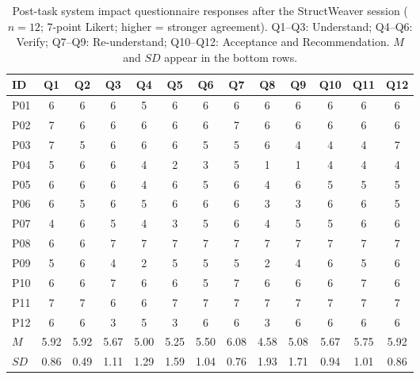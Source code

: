 \documentclass[manuscript,review,anonymous]{acmart}
\begin{document}
\begin{table}[t]
\centering
\caption{Post-task system impact questionnaire responses after the StructWeaver session ($n=12$; 7-point Likert; higher = stronger agreement). Q1--Q3: Understand; Q4--Q6: Verify; Q7--Q9: Re-understand; Q10--Q12: Acceptance and Recommendation. $M$ and $SD$ appear in the bottom rows.}
\label{tab:system_impact_responses}
\small
\setlength{\tabcolsep}{3pt}
\begin{tabular}{lcccccccccccc}
\toprule
\textbf{ID} & \textbf{Q1} & \textbf{Q2} & \textbf{Q3} & \textbf{Q4} & \textbf{Q5} & \textbf{Q6} & \textbf{Q7} & \textbf{Q8} & \textbf{Q9} & \textbf{Q10} & \textbf{Q11} & \textbf{Q12} \\
\midrule
P01 & 6 & 6 & 6 & 5 & 6 & 6 & 6 & 6 & 6 & 6 & 6 & 6 \\
P02 & 7 & 6 & 6 & 6 & 6 & 6 & 7 & 6 & 6 & 6 & 6 & 6 \\
P03 & 7 & 5 & 6 & 6 & 6 & 5 & 5 & 6 & 4 & 4 & 4 & 7 \\
P04 & 5 & 6 & 6 & 4 & 2 & 3 & 5 & 1 & 1 & 4 & 4 & 4 \\
P05 & 6 & 6 & 6 & 4 & 6 & 5 & 6 & 4 & 6 & 5 & 5 & 5 \\
P06 & 6 & 5 & 6 & 5 & 6 & 6 & 6 & 3 & 3 & 6 & 6 & 5 \\
P07 & 4 & 6 & 5 & 4 & 3 & 5 & 6 & 4 & 5 & 5 & 6 & 6 \\
P08 & 6 & 6 & 7 & 7 & 7 & 7 & 7 & 7 & 7 & 7 & 7 & 7 \\
P09 & 5 & 6 & 4 & 2 & 5 & 5 & 5 & 2 & 4 & 6 & 5 & 6 \\
P10 & 6 & 6 & 7 & 6 & 6 & 5 & 7 & 6 & 6 & 6 & 7 & 6 \\
P11 & 7 & 7 & 6 & 6 & 7 & 7 & 7 & 7 & 7 & 7 & 7 & 7 \\
P12 & 6 & 6 & 3 & 5 & 3 & 6 & 6 & 3 & 6 & 6 & 6 & 6 \\
\midrule
$M$ & 5.92 & 5.92 & 5.67 & 5.00 & 5.25 & 5.50 & 6.08 & 4.58 & 5.08 & 5.67 & 5.75 & 5.92 \\
$SD$ & 0.86 & 0.49 & 1.11 & 1.29 & 1.59 & 1.04 & 0.76 & 1.93 & 1.71 & 0.94 & 1.01 & 0.86 \\
\bottomrule
\end{tabular}
\end{table}




\end{document}
